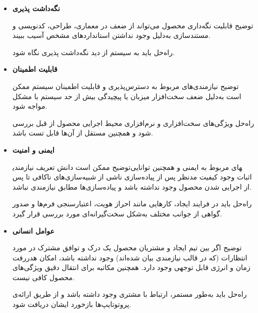 \begin{itemize}
	
	\item 
	\textbf{نگه‌داشت پذیری}

	توضیح \hspace*{1cm} 
قابلیت نگه‌داری محصول می‌تواند از ضعف در معماری، طراحی، کدنویسی و مستندسازی به‌دلیل وجود نداشتن استانداردهای مشخص آسیب ببیند.
	
	راه‌حل \hspace*{1cm} 
باید به سیستم از دید نگه‌داشت پذیری نگاه شود.
		
	\item 
	\textbf{قابلیت اطمینان}

	توضیح \hspace*{1cm} 
نیازمندی‌های مربوط به دسترس‌پذیری و قابلیت اطمینان سیستم ممکن است به‌دلیل ضعف سخت‌افزار میزبان یا پیچیدگی بیش از حد سیستم با مشکل مواجه شود.
	
	راه‌حل \hspace*{1cm} 
ویژگی‌های سخت‌افزاری و نرم‌افزاری محیط اجرایی محصول از قبل بررسی شود و همچنین مستقل از آن‌ها قابل تست باشد.
		
	\item 
	\textbf{ایمنی و امنیت}

	توضیح \hspace*{1cm} 
ممکن است دانش تعریف نیازمندی‎های مربوط به ایمنی و همچنین توانایی اثبات وجود کیفیت مدنظر پس از پیاده‌سازی ناشی از شبیه‌سازی‌های ناکافی تا پس از اجرایی شدن محصول وجود نداشته باشد و پیاده‌سازی‌ها مطابق نیازمندی نباشد.
	
	راه‌حل \hspace*{1cm} 
باید در فرایند ایجاد، کارهایی مانند احراز هویت، اعتبارسنجی فرم‌ها و صدور گواهی از جوانب مختلف به‌شکل سخت‌گیرانه‌ای مورد بررسی قرار گیرد.
		
	\item 
	\textbf{عوامل انسانی}

	توضیح \hspace*{1cm} 
اگر بین تیم ایجاد و مشتریان محصول یک درک و توافق مشترک در مورد انتظارات (که در قالب نیازمندی بیان شده‌اند) وجود نداشته باشد، امکان هدررفت زمان و انرژی قابل توجهی وجود دارد. همچنین مکاتبه برای انتقال دقیق ویژگی‌های محصول کافی نیست.
	
	راه‌حل \hspace*{1cm} 
باید به‌طور مستمر، ارتباط با مشتری وجود داشته باشد و از طریق ارائه‌ی پروتوتایپ‌ها بازخورد ایشان دریافت شود.
				
\end{itemize}

